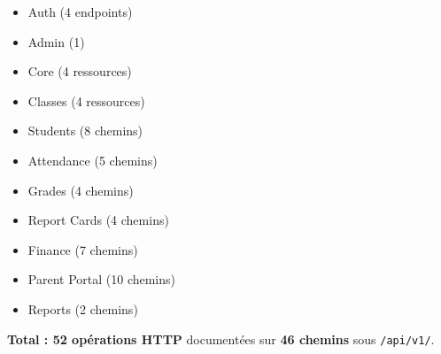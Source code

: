 \documentclass[11pt,a4paper]{article}
\begin{document}
\begin{itemize}[noitemsep]
    \item[$\square$] Auth (4 endpoints)
    \item[$\square$] Admin (1)
    \item[$\square$] Core (4 ressources)
    \item[$\square$] Classes (4 ressources)
    \item[$\square$] Students (8 chemins)
    \item[$\square$] Attendance (5 chemins)
    \item[$\square$] Grades (4 chemins)
    \item[$\square$] Report Cards (4 chemins)
    \item[$\square$] Finance (7 chemins)
    \item[$\square$] Parent Portal (10 chemins)
    \item[$\square$] Reports (2 chemins)
\end{itemize}

\textbf{Total : 52 opérations HTTP} documentées sur \textbf{46 chemins} sous \texttt{/api/v1/}.
\end{document}
